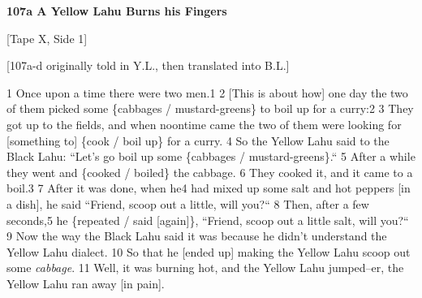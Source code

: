 
\textbf{107a A Yellow Lahu Burns his Fingers}

[Tape X, Side 1]

[107a-d originally told in Y.L., then translated into B.L.]

1 Once upon a time there were two men.1 2 [This is about how] one day the two of
them picked some \{cabbages / mustard-greens\} to boil up for a curry:2 3 They
got up to the fields, and when noontime came the two of them were looking for [something
to] \{cook / boil up\} for a curry. 4 So the Yellow Lahu said to the Black Lahu:
``Let's go boil up some \{cabbages / mustard-greens\}.`` 5 After
a while they went and \{cooked / boiled\} the cabbage. 6 They cooked it, and it
came to a boil.3 7 After it was done, when he4 had mixed up some salt and hot peppers
[in a dish], he said ``Friend, scoop out a little, will you?``
8 Then, after a few seconds,5 he \{repeated / said [again]\}, ``Friend,
scoop out a little salt, will you?`` 9 Now the way the Black Lahu said
it was because he didn't understand the Yellow Lahu dialect. 10 So that he [ended
up] making the Yellow Lahu scoop out some \textit{cabbage}. 11 Well, it was burning
hot, and the Yellow Lahu jumped--er, the Yellow Lahu ran away [in pain].

